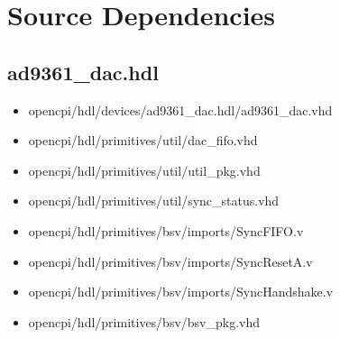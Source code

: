 \documentclass{article}
\def\comp{ad9361\_dac}
\begin{document}
\section*{Source Dependencies}
\subsection*{\comp.hdl}
\begin{itemize}
	\item opencpi/hdl/devices/ad9361\_dac.hdl/ad9361\_dac.vhd
	\item opencpi/hdl/primitives/util/dac\_fifo.vhd
	\item opencpi/hdl/primitives/util/util\_pkg.vhd
	\item opencpi/hdl/primitives/util/sync\_status.vhd
	\item opencpi/hdl/primitives/bsv/imports/SyncFIFO.v
	\item opencpi/hdl/primitives/bsv/imports/SyncResetA.v
	\item opencpi/hdl/primitives/bsv/imports/SyncHandshake.v
	\item opencpi/hdl/primitives/bsv/bsv\_pkg.vhd
\end{itemize}
\end{document}
